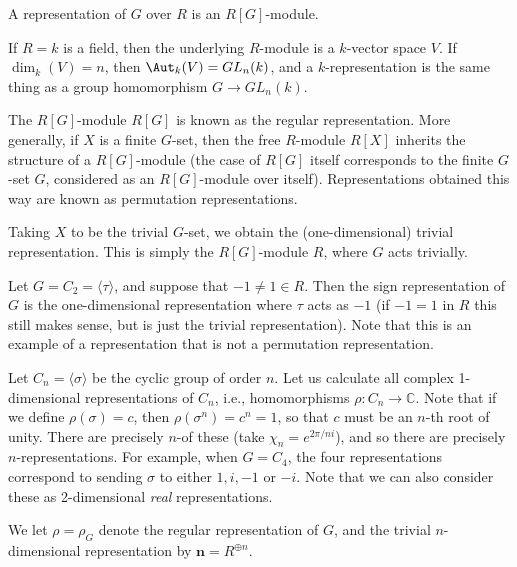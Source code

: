 \documentclass{willowtreebook}
\begin{document}
\begin{definition}
    A representation of $G$ over $R$ is an $R[G]$-module. 
\end{definition}
\begin{example}
    If $R = k$ is a field, then the underlying $R$-module is a $k$-vector space $V$. If $\dim_k(V) = n$, then $\Aut_k(V) = GL_n(k)$, and a $k$-representation is the same thing as a group homomorphism $G \to GL_n(k)$. 
\end{example}
\begin{definition}
    The $R[G]$-module $R[G]$ is known as the regular representation. More generally, if $X$ is a finite $G$-set, then the free $R$-module $R[X]$ inherits the structure of a $R[G]$-module (the case of $R[G]$ itself corresponds to the finite $G$-set $G$, considered as an $R[G]$-module over itself). Representations obtained this way are known as permutation representations. 
\end{definition}
\begin{example}
    Taking $X$ to be the trivial $G$-set, we obtain the (one-dimensional) trivial representation. This is simply the $R[G]$-module $R$, where $G$ acts trivially. 
\end{example}
\begin{definition}
    Let $G = C_2 = \langle \tau \rangle$, and suppose that $-1 \ne 1 \in R$. Then the sign representation of $G$ is the one-dimensional representation where $\tau$ acts as $-1$ (if $-1 = 1$ in $R$ this still makes sense, but is just the trivial representation). Note that this is an example of a representation that is not a permutation representation.
\end{definition}
\begin{example}
    Let $C_n = \langle \sigma \rangle$ be the cyclic group of order $n$. Let us calculate all complex 1-dimensional representations of $C_n$, i.e., homomorphisms $\rho \colon C_n \to \mathbb{C}$. Note that if we define $\rho(\sigma) =c$, then $\rho(\sigma^n) = c^n = 1$, so that $c$ must be an $n$-th root of unity. There are precisely $n$-of these (take $\chi_n = e^{2\pi/n i}$), and so there are precisely $n$-representations. For example, when $G = C_4$, the four representations correspond to sending $\sigma$ to either $1,i,-1$ or $-i$. Note that we can also consider these as 2-dimensional \emph{real} representations. 
\end{example}
\begin{notation}
We let $\rho = \rho_G$ denote the regular representation of $G$, and the trivial $n$-dimensional representation by $\mathbf{n} = R^{\oplus n}$. 
\end{notation}
\end{document}

